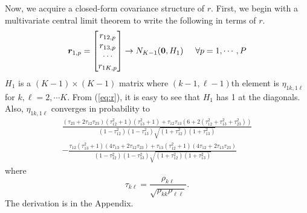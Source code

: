 \documentclass[aap,authoryear, preprint]{imsart}
\numberwithin{equation}{section}
\theoremstyle{plain}
\begin{document}
Now, we acquire a closed-form covariance structure of $r$. First, we begin with a multivariate central limit theorem to write the following in terms of $r$.
\begin{equation}
\bm{r}_{1,p} = \begin{bmatrix}
r_{12,p} \\ r_{13, p} \\ \cdots \\ r_{1K,p}
\end{bmatrix}  \rightarrow N_{K-1}(\bm{0}, H_1) \hspace{5mm} \forall p = 1, \cdots, P
\label{eq:H}
\end{equation}
$H_1$ is a $(K-1) \times (K-1)$ matrix where $(k-1, \ell-1)$th element is $\eta_{1k, 1\ell}$ for $k, \ell = 2, \cdots K$. From (\ref{eq:r}), it is easy to see that $H_1$ has 1 at the diagonals. Also, $\eta_{1k, 1\ell}$ converges in probability to
\begin{equation} \begin{multlined}
\frac{(\tau_{23}+2\tau_{12}\tau_{23})(\tau_{12}^2+1)(\tau_{13}^2+1) + \tau_{12}\tau_{13}(6+2(\tau_{12}^2+\tau_{13}^2+\tau_{23}^2))}{(1-{\tau}_{12}^2)(1-{\tau}_{13}^2)\sqrt{(1+{\tau}_{12}^2)(1+{\tau}_{13}^2)}} \\
- \frac{\tau_{12}(\tau_{13}^2+1)(4\tau_{13}+2\tau_{12}\tau_{23}) + \tau_{13}(\tau_{12}^2+1)(4\tau_{12}+2\tau_{13}\tau_{23})}{(1-{\tau}_{12}^2)(1-{\tau}_{13}^2)\sqrt{(1+{\tau}_{12}^2)(1+{\tau}_{13}^2)}}
\label{eq:eta}
\end{multlined} \end{equation}
where 
$${\tau}_{k\ell}= \frac{\rho_{k\ell}}{\sqrt{{\rho}_{kk}{\rho}_{\ell\ell}}}. $$
The derivation is in the Appendix. \\
\end{document}
